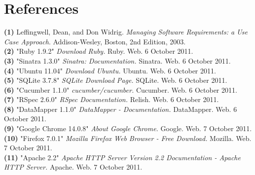 \documentclass{article}
\begin{document}
\section{References}
\hangindent=1.4cm
\textbf{(1)} Leffingwell, Dean, and Don Widrig.
\emph{Managing Software Requirements: a Use Case Approach}.
Addison-Wesley, Boston,
2nd Edition,
2003.\\

\noindent\hangindent=1.4cm
\textbf{(2)} "Ruby 1.9.2" 
\emph{Download Ruby.} Ruby. Web.  6 October 2011. \\

\noindent\hangindent=1.4cm
\textbf{(3)} "Sinatra 1.3.0" 
\emph{Sinatra: Documentation.} Sinatra. Web.  6 October 2011.\\

\noindent\hangindent=1.4cm
\textbf{(4)} "Ubuntu 11.04" 
\emph{Download Ubuntu.} Ubuntu. Web.  6 October 2011.\\

\noindent\hangindent=1.4cm
\textbf{(5)} "SQLite 3.7.8" 
\emph{SQLite Download Page.} SQLite. Web.  6 October 2011.\\

\noindent\hangindent=1.4cm
\textbf{(6)} "Cucumber 1.1.0" 
\emph{cucumber/cucumber.} Cucumber. Web.  6 October 2011.\\

\noindent\hangindent=1.4cm
\textbf{(7)} "RSpec 2.6.0" 
\emph{RSpec Documentation.} Relish. Web.  6 October 2011.\\

\noindent\hangindent=1.4cm
\textbf{(8)} "DataMapper 1.1.0" 
\emph{DataMapper - Documentation.} DataMapper. Web.  6 October 2011.\\

\noindent\hangindent=1.4cm
\textbf{(9)} "Google Chrome 14.0.8" 
\emph{About Google Chrome.} Google. Web.  7 October 2011.\\

\noindent\hangindent=1.4cm
\textbf{(10)} "Firefox 7.0.1" 
\emph{Mozilla Firefox Web Browser - Free Download.} Mozilla. Web.  7 October 2011.\\

\noindent\hangindent=1.4cm
\textbf{(11)} "Apache 2.2" 
\emph{Apache HTTP Server Version 2.2 Documentation - Apache HTTP Server.} Apache. Web.  7 October 2011.\\
\end{document}
